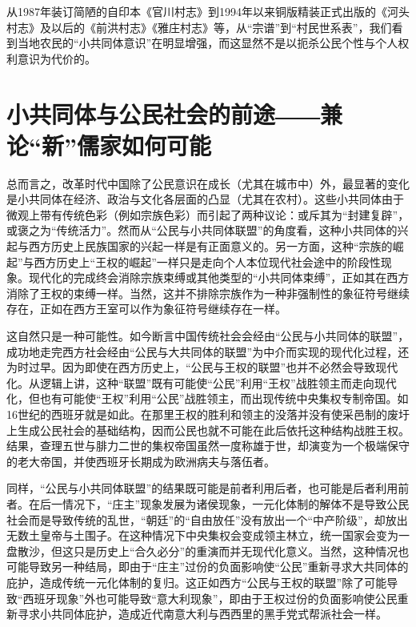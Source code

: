 \documentclass[a4paper,12pt,punct=kaiming,fontset=none]{ctexart}
\begin{document}
从1987年装订简陋的自印本《官川村志》到1994年以来铜版精装正式出版的《河头村志》及以后的《前洪村志》《雅庄村志》等，从“宗谱”到“村民世系表”，我们看到当地农民的“小共同体意识”在明显增强，而这显然不是以扼杀公民个性与个人权利意识为代价的。

\section*{小共同体与公民社会的前途――兼论“新”儒家如何可能}

总而言之，改革时代中国除了公民意识在成长（尤其在城市中）外，最显著的变化是小共同体在经济、政治与文化各层面的凸显（尤其在农村）。这些小共同体由于微观上带有传统色彩（例如宗族色彩）而引起了两种议论：或斥其为“封建复辟”，或褒之为“传统活力”。然而从“公民与小共同体联盟”的角度看，这种小共同体的兴起与西方历史上民族国家的兴起一样是有正面意义的。另一方面，这种“宗族的崛起”与西方历史上“王权的崛起”一样只是走向个人本位现代社会途中的阶段性现象。现代化的完成终会消除宗族束缚或其他类型的“小共同体束缚”，正如其在西方消除了王权的束缚一样。当然，这并不排除宗族作为一种非强制性的象征符号继续存在，正如在西方王室可以作为象征符号继续存在一样。

这自然只是一种可能性。如今断言中国传统社会会经由“公民与小共同体的联盟”，成功地走完西方社会经由“公民与大共同体的联盟”为中介而实现的现代化过程，还为时过早。因为即使在西方历史上，“公民与王权的联盟”也并不必然会导致现代化。从逻辑上讲，这种“联盟”既有可能使“公民”利用“王权”战胜领主而走向现代化，但也有可能使“王权”利用“公民”战胜领主，而出现传统中央集权专制帝国。如16世纪的西班牙就是如此。在那里王权的胜利和领主的没落并没有使采邑制的废圩上生成公民社会的基础结构，因而公民也就不可能在此后依托这种结构战胜王权。结果，查理五世与腓力二世的集权帝国虽然一度称雄于世，却演变为一个极端保守的老大帝国，并使西班牙长期成为欧洲病夫与落伍者。

同样，“公民与小共同体联盟”的结果既可能是前者利用后者，也可能是后者利用前者。在后一情况下，“庄主”现象发展为诸侯现象，一元化体制的解体不是导致公民社会而是导致传统的乱世，“朝廷”的“自由放任”没有放出一个“中产阶级”，却放出无数土皇帝与土围子。在这种情况下中央集权会变成领主林立，统一国家会变为一盘散沙，但这只是历史上“合久必分”的重演而并无现代化意义。当然，这种情况也可能导致另一种结局，即由于“庄主”过份的负面影响使“公民”重新寻求大共同体的庇护，造成传统一元化体制的复归。这正如西方“公民与王权的联盟”除了可能导致“西班牙现象”外也可能导致“意大利现象”，即由于王权过份的负面影响使公民重新寻求小共同体庇护，造成近代南意大利与西西里的黑手党式帮派社会一样。
\end{document}
